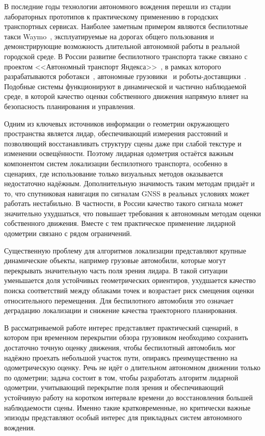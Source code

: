 \introduction %

В последние годы технологии автономного вождения перешли из стадии лабораторных прототипов к практическому применению в городских транспортных сервисах. Наиболее заметным примером являются беспилотные такси Waymo~\cite{waymo-habr}, эксплуатируемые на дорогах общего пользования и демонстрирующие возможность длительной автономной работы в реальной городской среде. В России развитие беспилотного транспорта также связано с проектом <<Автономный транспорт Яндекса>>~\cite{yandex-autonomy}, в рамках которого разрабатываются роботакси~\cite{yandex-robotaxi}, автономные грузовики~\cite{yandex-truck} и роботы-доставщики~\cite{yandex-rovers}. Подобные системы функционируют в динамической и частично наблюдаемой среде, в которой качество оценки собственного движения напрямую влияет на безопасность планирования и управления.

Одним из ключевых источников информации о геометрии окружающего пространства является лидар, обеспечивающий измерения расстояний и позволяющий восстанавливать структуру сцены даже при слабой текстуре и изменении освещённости. Поэтому лидарная одометрия остаётся важным компонентом систем локализации беспилотного транспорта, особенно в сценариях, где использование только визуальных методов оказывается недостаточно надёжным. Дополнительную значимость таким методам придаёт и то, что спутниковая навигация по сигналам GNSS в реальных условиях может работать нестабильно. В частности, в России качество такого сигнала может значительно ухудшаться, что повышает требования к автономным методам оценки собственного движения. Вместе с тем практическое применение лидарной одометрии связано с рядом ограничений.

Существенную проблему для алгоритмов локализации представляют крупные динамические объекты, например грузовые автомобили, которые могут перекрывать значительную часть поля зрения лидара. В такой ситуации уменьшается доля устойчивых геометрических ориентиров, ухудшается качество поиска соответствий между облаками точек и возрастает риск смещения оценки относительного перемещения. Для беспилотного автомобиля это означает деградацию локализации и снижение качества траекторного планирования.

В рассматриваемой работе интерес представляет практический сценарий, в котором при временном перекрытии обзора грузовиком необходимо сохранить достаточно точную оценку движения, чтобы беспилотный автомобиль мог надёжно проехать небольшой участок пути, опираясь преимущественно на одометрическую оценку. Речь не идёт о длительном автономном движении только по одометрии; задача состоит в том, чтобы разработать алгоритм лидарной одометрии, учитывающий перекрытие поля зрения и обеспечивающий устойчивую работу на коротком интервале времени до восстановления большей наблюдаемости сцены. Именно такие кратковременные, но критически важные эпизоды представляют особый интерес для прикладных систем автономного вождения.

